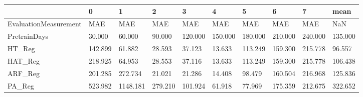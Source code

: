 \begin{tabular}{llllllllll}
\toprule
{} &       0 &        1 &       2 &       3 &       4 &       5 &       6 &       7 &    mean \\
\midrule
EvaluationMeasurement &     MAE &      MAE &     MAE &     MAE &     MAE &     MAE &     MAE &     MAE &     NaN \\
PretrainDays          &  30.000 &   60.000 &  90.000 & 120.000 & 150.000 & 180.000 & 210.000 & 240.000 & 135.000 \\
HT\_Reg                & 142.899 &   61.882 &  28.593 &  37.123 &  13.633 & 113.249 & 159.300 & 215.778 &  96.557 \\
HAT\_Reg               & 218.925 &   64.953 &  28.553 &  37.116 &  13.633 & 113.249 & 159.300 & 215.778 & 106.438 \\
ARF\_Reg               & 201.285 &  272.734 &  21.021 &  21.286 &  14.408 &  98.479 & 160.504 & 216.968 & 125.836 \\
PA\_Reg                & 523.982 & 1148.181 & 279.210 & 101.924 &  61.918 &  77.969 & 175.359 & 212.675 & 322.652 \\
\bottomrule
\end{tabular}
